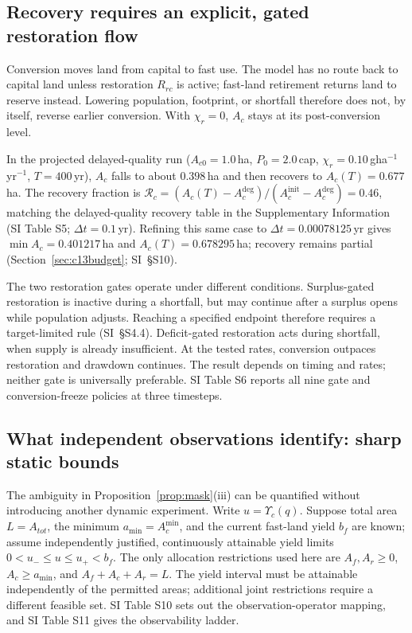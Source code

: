 \documentclass[preprint,12pt,authoryear]{elsarticle}
\newcommand{\Ups}{\Upsilon_c}
\newcommand{\Acmin}{A_c^{\min}}
\begin{document}
\subsection{Recovery requires an explicit, gated restoration flow}\label{sec:recovery}

Conversion moves land from capital to fast use. The model has no route back to capital land unless restoration $R_{rc}$ is active; fast-land retirement returns land to reserve instead. Lowering population, footprint, or shortfall therefore does not, by itself, reverse earlier conversion. With $\chi_r=0$, $A_c$ stays at its post-conversion level.

In the projected delayed-quality run ($A_{c0}=1.0$\,ha, $P_0=2.0$\,cap, $\chi_r=0.10$\,gha$^{-1}$\,yr$^{-1}$, $T=400$\,yr), $A_c$ falls to about $0.398$\,ha and then recovers to $A_c(T)=0.677$\,ha. The recovery fraction is $\mathcal R_c=(A_c(T)-A_c^{\mathrm{deg}})/(A_c^{\mathrm{init}}-A_c^{\mathrm{deg}})=0.46$, matching the delayed-quality recovery table in the Supplementary Information (SI Table S5; $\Delta t=0.1$\,yr). Refining this same case to $\Delta t=0.00078125$\,yr gives $\min A_c=0.401217$\,ha and $A_c(T)=0.678295$\,ha; recovery remains partial (Section~\ref{sec:c13budget}; SI~\S S10).

The two restoration gates operate under different conditions. Surplus-gated restoration is inactive during a shortfall, but may continue after a surplus opens while population adjusts. Reaching a specified endpoint therefore requires a target-limited rule (SI~\S S4.4). Deficit-gated restoration acts during shortfall, when supply is already insufficient. At the tested rates, conversion outpaces restoration and drawdown continues. The result depends on timing and rates; neither gate is universally preferable. SI Table S6 reports all nine gate and conversion-freeze policies at three timesteps.

\subsection{What independent observations identify: sharp static bounds}\label{sec:c13ident}

The ambiguity in Proposition~\ref{prop:mask}(iii) can be quantified without introducing another dynamic experiment. Write $u=\Ups(q)$. Suppose total area $L=A_{tot}$, the minimum $a_{\min}=\Acmin$, and the current fast-land yield $b_f$ are known; assume independently justified, continuously attainable yield limits $0<u_-\le u\le u_+<b_f$. The only allocation restrictions used here are $A_f,A_r\ge0$, $A_c\ge a_{\min}$, and $A_f+A_c+A_r=L$. The yield interval must be attainable independently of the permitted areas; additional joint restrictions require a different feasible set. SI Table S10 sets out the observation-operator mapping, and SI Table S11 gives the observability ladder.
\end{document}
